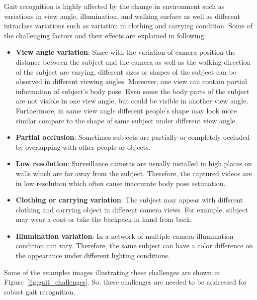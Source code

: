 Gait recognition is highly affected by the change in environment such as variations in view angle, illumination, and walking surface as well as different intraclass variations such as variation in clothing and carrying condition. Some of the challenging factors and their effects are explained in following:
\begin{itemize}
	\item \textbf{View angle variation}: Since with the variation of camera position the distance between the subject and the camera as well as the walking direction of the subject are varying, different sizes or shapes of the subject can be observed in different viewing angles. Moreover, one view can contain partial information of subject's body pose. Even some the body parts of the subject are not visible in one view angle, but could be visible in another view angle. Furthermore, in same view angle different people's shape may look more similar compare to the shape of same subject under different view angle. 
	
	\item \textbf{Partial occlusion}: Sometimes subjects are partially or completely occluded by overlapping with other people or objects. 
	
	\item \textbf{Low resolution}: Surveillance cameras are usually installed in high places on walls which are far away from the subject. Therefore, the captured videos are in low resolution which often cause inaccurate body pose estimation.
	
	\item \textbf{Clothing or carrying variation}: The subject may appear with different clothing and carrying object in different camera views. For example, subject may wear a coat or take the backpack in hand from back.
	
	\item \textbf{Illumination variation}: In a network of multiple camera illumination condition can vary. Therefore, the same subject can have a color difference on the appearance under different lighting conditions. 
\end{itemize}

Some of the examples images illustrating these challenges are shown in Figure~\ref{fig:gait_challenges}. So, these challenges are needed to be addressed for robust gait recognition.



